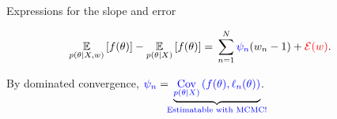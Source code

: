 \begin{frame}[t]{Expressions for the slope and error}

%
\begin{align*}
\expect{p(\theta \vert \xvec, \w)}{f(\theta)} -
    \expect{p(\theta \vert \xvec)}{f(\theta)} ={}&
    \sumn \blue{\infl_n} (\w_n - 1) +
    \red{\err(\w)}.
%
\end{align*}       
%

\pause

By dominated convergence,
%
%
$
\blue{\infl_n} ={}
\undernote{\blue{
    \cov{\p(\theta \vert \xvec)}{ f(\theta), \ell_n(\theta)}
}}{\blue{\substack{
    \text{Estimatable with MCMC!} \\
}}}
$.


\end{frame}
